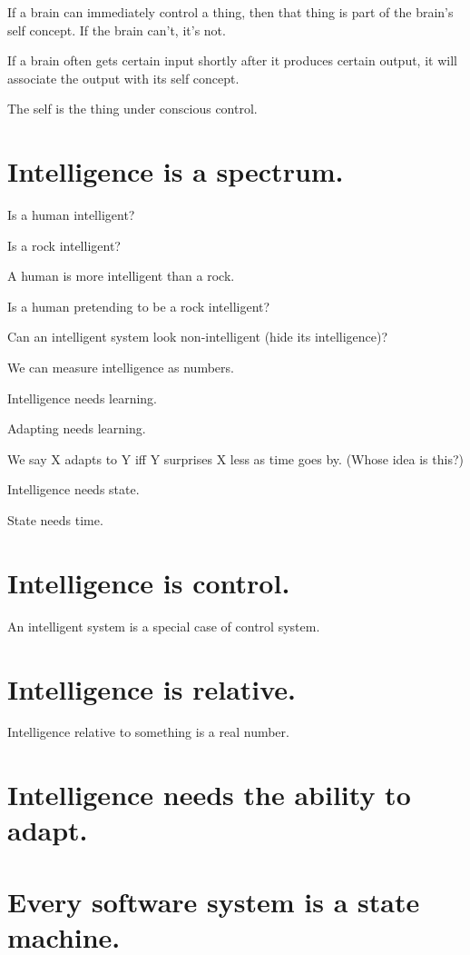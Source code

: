 If a brain can immediately control a thing,
then that thing is part of the brain's self concept.
If the brain can't, it's not.

If a brain often gets certain input shortly after it produces certain output,
it will associate the output with its self concept.

The self is the thing under conscious control.

\section{Intelligence is a spectrum.}

Is a human intelligent?

Is a rock intelligent?

A human is more intelligent than a rock.

Is a human pretending to be a rock intelligent?

Can an intelligent system look non-intelligent (hide its intelligence)?

We can measure intelligence as numbers.

Intelligence needs learning.

Adapting needs learning.

We say X adapts to Y iff Y surprises X less as time goes by. (Whose idea is this?)

Intelligence needs state.

State needs time.

\section{Intelligence is control.}

An intelligent system is a special case of control system.

\section{Intelligence is relative.}

Intelligence relative to something is a real number.

\section{Intelligence needs the ability to adapt.}

\section{Every software system is a state machine.}

